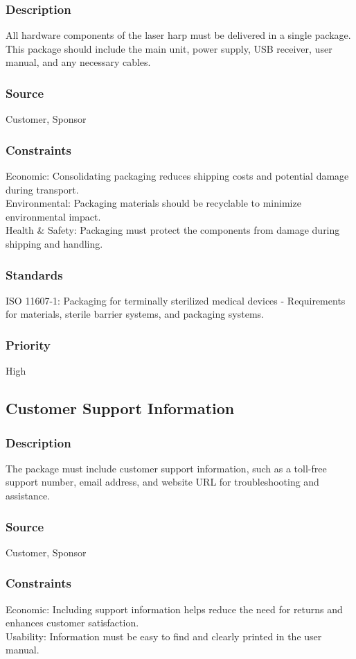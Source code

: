 \subsubsection{Description}
All hardware components of the laser harp must be delivered in a single package. This package should include the main unit, power supply, USB receiver, user manual, and any necessary cables.
\subsubsection{Source}
Customer, Sponsor
\subsubsection{Constraints}
Economic: Consolidating packaging reduces shipping costs and potential damage during transport.\\
Environmental: Packaging materials should be recyclable to minimize environmental impact.\\
Health & Safety: Packaging must protect the components from damage during shipping and handling.
\subsubsection{Standards}
ISO 11607-1: Packaging for terminally sterilized medical devices - Requirements for materials, sterile barrier systems, and packaging systems.
\subsubsection{Priority}
High


\subsection{Customer Support Information}
\subsubsection{Description}
The package must include customer support information, such as a toll-free support number, email address, and website URL for troubleshooting and assistance.
\subsubsection{Source}
Customer, Sponsor
\subsubsection{Constraints}
Economic: Including support information helps reduce the need for returns and enhances customer satisfaction.\\
Usability: Information must be easy to find and clearly printed in the user manual.
